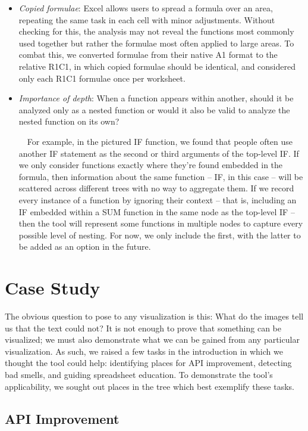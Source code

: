 \documentclass[conference]{IEEEtran}
\begin{document}
\begin{itemize}
		\item \textit{Copied formulae}: Excel allows users to spread a formula over an
		area, repeating the same task in each cell with minor adjustments. Without
		checking for this, the analysis may not reveal the functions most commonly
		used together but rather the formulae most often applied to large areas. To
		combat this, we converted formulae from their native A1 format to the relative
		R1C1, in which copied formulae should be identical, and considered only each
		R1C1 formulae once per worksheet.
		
		\item \textit{Importance of depth}: When a function appears within another,
		should it be analyzed only as a nested function or would it also be valid to
		analyze the nested function on its own? \par
		
		\ \ For example, in the pictured IF function, we found that people often use
		another IF statement as the second or third arguments of the top-level IF. If
		we only consider functions exactly where they're found embedded in the
		formula, then information about the same function -- IF, in this case -- will
		be scattered across different trees with no way to aggregate them. If we
		record every instance of a function by ignoring their context -- that is,
		including an IF embedded within a SUM function in the same node as the
		top-level IF -- then the tool will represent some functions in multiple nodes
		to capture every possible level of nesting. For now, we only include the
		first, with the latter to be added as an option in the future.
		
	\end{itemize}
	
	\section{Case Study} The obvious question to pose to any visualization is this:
	What do the images tell us that the text could not? It is not enough to
	prove that something can be visualized; we must also demonstrate what
	we can be gained from any particular visualization. As such, we raised a few
	tasks in the introduction in which we thought the tool could help: identifying
	places for API improvement, detecting bad smells, and guiding spreadsheet education. To demonstrate the tool's
	applicability, we sought out places in the tree which best exemplify
	these tasks.
	
	\subsection{API Improvement}
	
\end{document}
